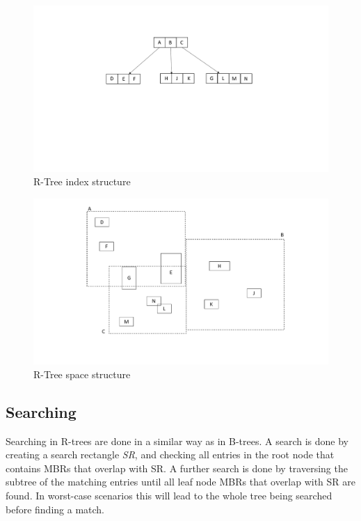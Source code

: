 \begin{figure}[ht]
    \centering
    \includegraphics[scale=0.4]{figures/RTree.pdf}
    \caption{R-Tree index structure}
    \label{fig:RTree}
\end{figure}

\begin{figure}[ht]
    \centering
    \includegraphics[scale=0.3]{figures/RTree_space.pdf}
    \caption{R-Tree space structure}
    \label{fig:RtreeSpace}
\end{figure}

\subsection{Searching}
Searching in R-trees are done in a similar way as in B-trees. A search is done by creating a search rectangle \emph{SR}, and checking all entries in the root node that contains MBRs that overlap with SR. A further search is done by traversing the subtree of the matching entries until all leaf node MBRs that overlap with SR are found. In worst-case scenarios this will lead to the whole tree being searched before finding a match. 

